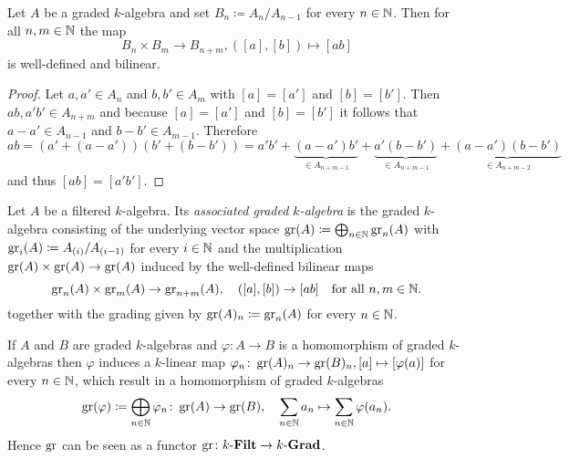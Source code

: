 \begin{lem}
 Let $A$ be a graded $k$-algebra and set $B_n \coloneqq A_n/A_{n-1}$ for every $n \in \mathbb{N}$. Then for all $n,m \in \mathbb{N}$ the map
 \[
  B_n \times B_m \to B_{n+m}, ([a], [b]) \mapsto [ab]
 \]
 is well-defined and bilinear.
\end{lem}
\begin{proof}
 Let $a, a' \in A_n$ and $b, b' \in A_m$ with $[a] = [a']$ and $[b] = [b']$. Then $ab, a'b' \in A_{n+m}$ and because $[a] = [a']$ and $[b] = [b']$ it follows that $a-a' \in A_{n-1}$ and $b-b' \in A_{m-1}$. Therefore
 \[
  ab
  = (a'+(a-a'))(b'+(b-b'))
  = a'b' + \underbrace{(a-a')b'}_{\in A_{n+m-1}} + \underbrace{a'(b-b')}_{\in A_{n+m-1}} + \underbrace{(a-a')(b-b')}_{\in A_{n+m-2}}
 \]
 and thus $[ab] = [a'b']$.
\end{proof}


\begin{defi}
 Let $A$ be a filtered $k$-algebra. Its \emph{associated graded $k$-algebra} is the graded $k$-algebra consisting of the underlying vector space $\operatorname{gr}(A) \coloneqq \bigoplus_{n \in \mathbb{N}} \operatorname{gr}_n(A)$ with $\operatorname{gr}_i(A) \coloneqq A_{(i)} / A_{(i-1)}$ for every $i \in \mathbb{N}$ and the multiplication $\operatorname{gr}(A) \times \operatorname{gr}(A) \to \operatorname{gr}(A)$ induced by the well-defined bilinear maps
 \[
  \operatorname{gr}_n(A) \times \operatorname{gr}_m(A) \to \operatorname{gr}_{n+m}(A), \quad
  ([a],[b]) \to [ab]
  \quad\text{for all $n,m \in \mathbb{N}$}.
 \]
 together with the grading given by $\operatorname{gr}(A)_n \coloneqq \operatorname{gr}_n(A)$ for every $n \in \mathbb{N}$.
\end{defi}


\begin{rem}
 If $A$ and $B$ are graded $k$-algebras and $\varphi \colon A \to B$ is a homomorphism of graded $k$-algebras then $\varphi$ induces a $k$-linear map $\varphi_n \colon \operatorname{gr}(A)_n \to \operatorname{gr}(B)_n, [a] \mapsto [\varphi(a)]$ for every $n \in \mathbb{N}$, which result in a homomorphism of graded $k$-algebras
 \[
  \operatorname{gr}(\varphi) \coloneqq \bigoplus_{n \in \mathbb{N}} \varphi_n \colon \operatorname{gr}(A) \to \operatorname{gr}(B),
  \quad
  \sum_{n \in \mathbb{N}} a_n \mapsto \sum_{n \in \mathbb{N}} \varphi(a_n).
 \]
 Hence $\operatorname{gr}$ can be seen as a functor $\operatorname{gr} \colon k\text{-}\mathbf{Filt} \to k\text{-}\mathbf{Grad}$.
\end{rem}


